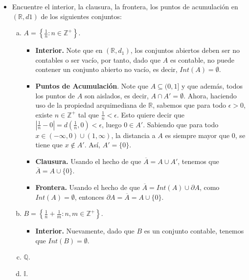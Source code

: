 \begin{itemize}[leftmargin=*]
    \item Encuentre el interior, la clausura, la frontera, los puntos de acumulación en $(\mathbb{R}, d1)$ de los siguientes conjuntos:
    \begin{enumerate}[a)]
        \item $\displaystyle A=\left\{\frac{1}{n}:n \in \mathbb{Z}^+\right\}$.
        \begin{solution}
            \begin{itemize}
                \item \textbf{Interior.} Note que en $(\mathbb{R},d_1)$, los conjuntos abiertos deben ser no contables o ser vacío, por tanto, dado que $A$ es contable, no puede contener un conjunto abierto no vacío, es decir, $Int(A)=\emptyset$.
                \item \textbf{Puntos de Acumulación}. Note que $A \subseteq (0,1]$ y que además, todos los puntos de $A$ son aislados, es decir, $A \cap A'= \emptyset$. Ahora, haciendo uso de la propiedad arquimediana de $\mathbb{R}$, sabemos que para todo $\epsilon>0$, existe $n \in \mathbb{Z}^+$ tal que $\displaystyle \frac{1}{n}<\epsilon$. Esto quiere decir que $\displaystyle \left| \frac{1}{n}-0\right|=d\left(\frac{1}{n},0\right)<\epsilon$, luego $0 \in A'$. Sabiendo que para todo $x \in (-\infty,0)\cup (1,\infty)$, la distancia a $A$ es siempre mayor que $0$, se tiene que $x\notin A'$. Así, $A'=\{0\}$.
                \item \textbf{Clausura.} Usando el hecho de que $\overline{A}=A\cup A'$, tenemos que $\overline{A}=A\cup \{0\}$.
                \item \textbf{Frontera.} Usando el hecho de que $\overline{A}=Int(A)\cup \partial A$, como $Int(A)=\emptyset$, entonces $\partial A=\overline{A}=A\cup \{0\}$.
            \end{itemize}
        \end{solution}
        \item $\displaystyle B=\left\{\frac{1}{n}+\frac{1}{m}:n,m \in \mathbb{Z}^+\right\}$.
        \begin{solution}
            \begin{itemize}
                \item \textbf{Interior.} Nuevamente, dado que $B$ es un conjunto contable, tenemos que $Int(B)=\emptyset$.
            \end{itemize}
        \end{solution}
        \item $\mathbb{Q}$.
        \item $\mathbb{I}$.

\end{enumerate}
\end{itemize}

